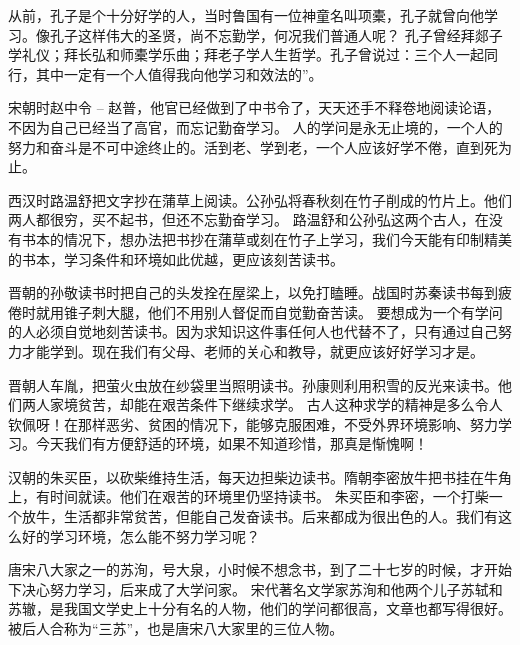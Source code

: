 \documentclass[avery5371,grid]{flashcards}
\begin{document}
{从前，孔子是个十分好学的人，当时鲁国有一位神童名叫项橐，孔子就曾向他学习。像孔子这样伟大的圣贤，尚不忘勤学，何况我们普通人呢？} %
{孔子曾经拜郯子学礼仪；拜长弘和师橐学乐曲；拜老子学人生哲学。孔子曾说过：三个人一起同行，其中一定有一个人值得我向他学习和效法的”。} %

{宋朝时赵中令 -- 赵普，他官已经做到了中书令了，天天还手不释卷地阅读论语，不因为自己已经当了高官，而忘记勤奋学习。} %
{人的学问是永无止境的，一个人的努力和奋斗是不可中途终止的。活到老、学到老，一个人应该好学不倦，直到死为止。} %

{西汉时路温舒把文字抄在蒲草上阅读。公孙弘将春秋刻在竹子削成的竹片上。他们两人都很穷，买不起书，但还不忘勤奋学习。} %
{路温舒和公孙弘这两个古人，在没有书本的情况下，想办法把书抄在蒲草或刻在竹子上学习，我们今天能有印制精美的书本，学习条件和环境如此优越，更应该刻苦读书。} %

{晋朝的孙敬读书时把自己的头发拴在屋梁上，以免打瞌睡。战国时苏秦读书每到疲倦时就用锥子刺大腿，他们不用别人督促而自觉勤奋苦读。} %
{要想成为一个有学问的人必须自觉地刻苦读书。因为求知识这件事任何人也代替不了，只有通过自己努力才能学到。现在我们有父母、老师的关心和教导，就更应该好好学习才是。} %

{晋朝人车胤，把萤火虫放在纱袋里当照明读书。孙康则利用积雪的反光来读书。他们两人家境贫苦，却能在艰苦条件下继续求学。} %
{古人这种求学的精神是多么令人钦佩呀！在那样恶劣、贫困的情况下，能够克服困难，不受外界环境影响、努力学习。今天我们有方便舒适的环境，如果不知道珍惜，那真是惭愧啊！} %

{汉朝的朱买臣，以砍柴维持生活，每天边担柴边读书。隋朝李密放牛把书挂在牛角上，有时间就读。他们在艰苦的环境里仍坚持读书。} %
{朱买臣和李密，一个打柴一个放牛，生活都非常贫苦，但能自己发奋读书。后来都成为很出色的人。我们有这么好的学习环境，怎么能不努力学习呢？} %

{唐宋八大家之一的苏洵，号大泉，小时候不想念书，到了二十七岁的时候，才开始下决心努力学习，后来成了大学问家。} %
{宋代著名文学家苏洵和他两个儿子苏轼和苏辙，是我国文学史上十分有名的人物，他们的学问都很高，文章也都写得很好。被后人合称为“三苏”，也是唐宋八大家里的三位人物。} %
\end{document}

